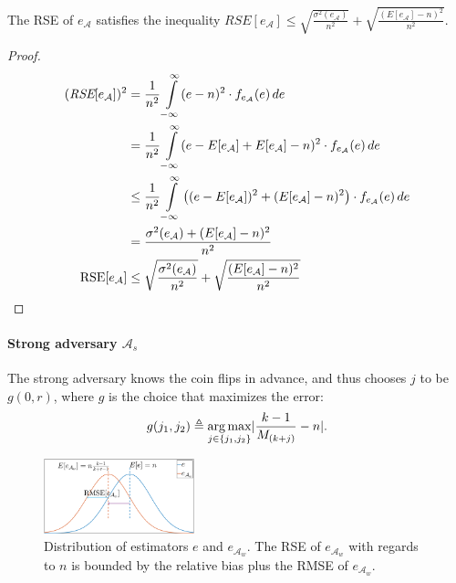 \begin{lemma}
    The RSE of $e_{\mathcal{A}}$ satisfies the inequality 
    $\textit{RSE}[e_{\mathcal{A}}] \leq \sqrt{\frac{\sigma^2(e_{\mathcal{A}})}{n^2}} + \sqrt{\frac{(E[e_{\mathcal{A}}] - n)^2}{n^2}}$.
    \label{fc-lemma:theta-adversary-bound}
\end{lemma}
\begin{proof}
    \begin{align*}
    \begin{split}
    (\textit{RSE}[e_{\mathcal{A}}])^2 &= \frac{1}{n^2} \int\limits_{-\infty}^{\infty} (e - n)^2 \cdot f_{e_{\mathcal{A}}}(e) \,de \\
    &= \frac{1}{n^2} \int\limits_{-\infty}^{\infty} (e - E[e_{\mathcal{A}}] + E[e_{\mathcal{A}}] - n)^2 \cdot f_{e_{\mathcal{A}}}(e) \,de \\
    &\leq \frac{1}{n^2} \int\limits_{-\infty}^{\infty} \left((e - E[e_{\mathcal{A}}])^2 + (E[e_{\mathcal{A}}] - n)^2 \right)\cdot f_{e_{\mathcal{A}}}(e) \,de \\
    &= \frac{\sigma^2(e_{\mathcal{A}}) + (E[e_{\mathcal{A}}] - n)^2}{n^2} \\
    \text{RSE}[e_{\mathcal{A}}] &\leq \sqrt{\frac{\sigma^2(e_{\mathcal{A}})}{n^2}} + \sqrt{\frac{(E[e_{\mathcal{A}}] - n)^2}{n^2}}
    \end{split}
    \end{align*}
\end{proof}

\paragraph{Strong adversary ${\mathcal{A}}_s$} The strong adversary knows the coin flips in advance, and thus chooses
$j$ to be $g(0, r)$, where $g$ is the
choice that maximizes the error:
\begin{align*}
    g(j_1, j_2) \triangleq \operatorname*{arg\,max}_{j \in \left\{j_1, j_2\right\}} \lvert\frac{k-1}{M_{(k+j)}} - n\rvert.
\end{align*} 

\begin{figure}[b]
    \begin{center}
        \includegraphics[width=0.39\textwidth]{graphics/fast-concurrent/thetaGraph.png}
    \end{center}
    \caption{Distribution of estimators $e$ and $e_{{\mathcal{A}}_w}$. The RSE of $e_{{\mathcal{A}}_w}$ with regards to $n$ is bounded
    by the relative bias plus the RMSE of $e_{{\mathcal{A}}_w}$.}%
    \label{fc-fig:thetaGraph}
\end{figure}

